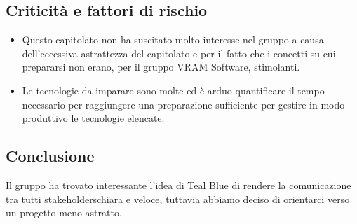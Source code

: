 \subsection{Criticità e fattori di rischio}
\begin{itemize}
	\item Questo capitolato non ha suscitato molto interesse nel gruppo a causa dell'eccessiva astrattezza del capitolato e per il fatto che i concetti su cui prepararsi non erano, per il gruppo VRAM Software, stimolanti. 
	\item Le tecnologie da imparare sono molte ed è arduo quantificare il tempo necessario per raggiungere una preparazione sufficiente per gestire in modo produttivo le tecnologie elencate.
\end{itemize}
\subsection{Conclusione}
Il gruppo ha trovato interessante l'idea di Teal Blue di rendere la comunicazione tra tutti stakeholders\glosp chiara e veloce, tuttavia abbiamo deciso di orientarci verso un progetto meno astratto.